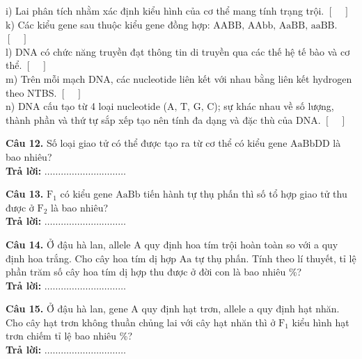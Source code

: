 \documentclass{article}
\begin{document}
i) Lai phân tích nhằm xác định kiểu hình của cơ thể mang tính trạng trội. \hfill $[\quad]$\\[8pt]
k) Các kiểu gene sau thuộc kiểu gene đồng hợp: $\text{AABB, AAbb, AaBB, aaBB}$. \hfill $[\quad]$\\[8pt]
l) DNA có chức năng truyền đạt thông tin di truyền qua các thế hệ tế bào và cơ thể. \hfill $[\quad]$\\[8pt]
m) Trên mỗi mạch DNA, các nucleotide liên kết với nhau bằng liên kết hydrogen theo NTBS. \hfill $[\quad]$\\[8pt]
n) DNA cấu tạo từ 4 loại nucleotide ($\text{A, T, G, C}$); sự khác nhau về số lượng, thành phần và thứ tự sắp xếp tạo nên tính đa dạng và đặc thù của DNA. \hfill $[\quad]$
\vspace*{\fill}
\newpage

\fontsize{26}{34}\selectfont
\textbf{Câu 12.} Số loại giao tử có thể được tạo ra từ cơ thể có kiểu gene $\text{AaBbDD}$ là bao nhiêu?\\
\textbf{Trả lời:} $\dots\dots\dots\dots\dots\dots\dots\dots\dots\dots$

\vspace*{\fill}

\textbf{Câu 13.} $\text{F}_1$ có kiểu gene $\text{AaBb}$ tiến hành tự thụ phấn thì số tổ hợp giao tử thu được ở $\text{F}_2$ là bao nhiêu?\\
\textbf{Trả lời:} $\dots\dots\dots\dots\dots\dots\dots\dots\dots\dots$
\vspace*{\fill}
\newpage

\fontsize{25}{33}\selectfont
\textbf{Câu 14.} Ở đậu hà lan, allele A quy định hoa tím trội hoàn toàn so với a quy định hoa trắng. Cho cây hoa tím dị hợp $\text{Aa}$ tự thụ phấn. Tính theo lí thuyết, tỉ lệ phần trăm số cây hoa tím dị hợp thu được ở đời con là bao nhiêu \%?\\
\textbf{Trả lời:} $\dots\dots\dots\dots\dots\dots\dots\dots\dots\dots$

\vspace*{\fill}

\textbf{Câu 15.} Ở đậu hà lan, gene A quy định hạt trơn, allele a quy định hạt nhăn. Cho cây hạt trơn không thuần chủng lai với cây hạt nhăn thì ở $\text{F}_1$ kiểu hình hạt trơn chiếm tỉ lệ bao nhiêu \%?\\
\textbf{Trả lời:} $\dots\dots\dots\dots\dots\dots\dots\dots\dots\dots$
\vspace*{\fill}
\newpage
\end{document}
